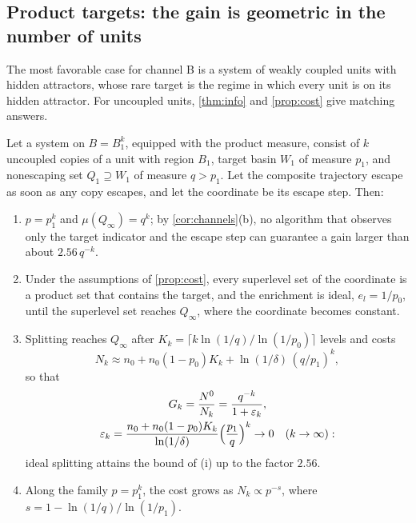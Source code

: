 \subsection{Product targets: the gain is geometric in the number of units}\label{sec:product}

The most favorable case for channel B is a system of weakly coupled units with hidden attractors, whose rare target is the regime in which every unit is on its hidden attractor. For uncoupled units, \cref{thm:info} and \cref{prop:cost} give matching answers.

\begin{proposition}\label{prop:product}
Let a system on $B=B_1^k$, equipped with the product measure, consist of $k$ uncoupled copies of a unit with region $B_1$, target basin $W_1$ of measure $p_1$, and nonescaping set $Q_1\supseteq W_1$ of measure $q>p_1$. Let the composite trajectory escape as soon as any copy escapes, and let the coordinate be its escape step. Then:
\begin{enumerate}
\item[\textup{(i)}] $p=p_1^k$ and $\mu(Q_\infty)=q^k$; by \cref{cor:channels}\textup{(b)}, no algorithm that observes only the target indicator and the escape step can guarantee a gain larger than about $2.56\,q^{-k}$.
\item[\textup{(ii)}] Under the assumptions of \cref{prop:cost}, every superlevel set of the coordinate is a product set that contains the target, and the enrichment is ideal, $e_l=1/p_0$, until the superlevel set reaches $Q_\infty$, where the coordinate becomes constant.
\item[\textup{(iii)}] Splitting reaches $Q_\infty$ after $K_k=\lceil k\ln(1/q)/\ln(1/p_0)\rceil$ levels and costs
\begin{equation}
N_k\approx n_0+n_0(1-p_0)K_k+\ln(1/\delta)\,(q/p_1)^k,
\label{eq:Nk}
\end{equation}
so that
\begin{gather*}
G_k=\frac{N^0}{N_k}=\frac{q^{-k}}{1+\varepsilon_k},\\
\varepsilon_k=\frac{n_0+n_0(1-p_0)K_k}{\ln(1/\delta)}\Bigl(\frac{p_1}{q}\Bigr)^k\to0\quad(k\to\infty):
\end{gather*}
ideal splitting attains the bound of \textup{(i)} up to the factor $2.56$.
\item[\textup{(iv)}] Along the family $p=p_1^k$, the cost grows as $N_k\propto p^{-s}$, where $s=1-\ln(1/q)/\ln(1/p_1)$.
\end{enumerate}
\end{proposition}

